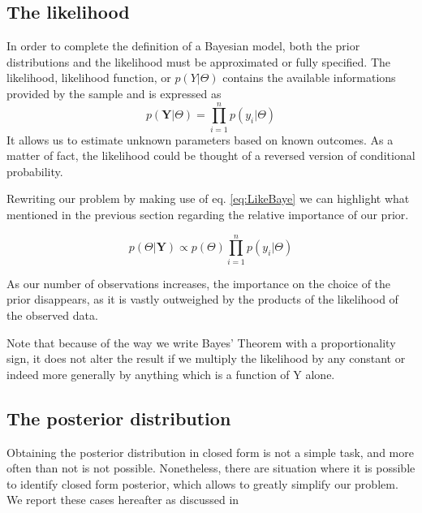 \documentclass[letterpaper]{article}
\begin{document}
\subsection{The likelihood}
In order to complete the definition of a Bayesian model, both the prior distributions and the likelihood must be approximated or fully specified.  The likelihood, likelihood function, or $p(Y|\Theta)$ contains the available informations provided by the sample and is expressed as
\begin{equation}
p(\textbf{Y}|\textbf{$\Theta$})=\prod_{i=1}^n p(y_i|\textbf{$\Theta$})
\label{eq:LikeBaye}
\end{equation}
It allows us to estimate unknown parameters based on known outcomes. As a matter of fact, the likelihood could be thought of a reversed version of conditional probability.  

Rewriting our problem by making use of eq. \ref{eq:LikeBaye} we can highlight what mentioned in the previous section regarding the relative importance of our prior.

\begin{equation}
p(\textbf{$\Theta$}|\textbf{Y}) \propto p(\textbf{$\Theta$})\prod_{i=1}^n p(y_i|\textbf{$\Theta$})
\label{ref:BayesLikeAndPrior}
\end{equation}

As our number of observations increases, the importance on the choice of the prior disappears, as it is vastly outweighed by the products of the likelihood of the observed data. 

Note that because of the way we write Bayes’ Theorem with a proportionality sign, it does not alter the result if we multiply the likelihood by any constant or indeed more generally by anything which is a function of Y alone. 

\subsection{The posterior distribution}
Obtaining the posterior distribution in closed form is not a simple task, and more often than not is not possible.  Nonetheless, there are situation where it is possible to identify closed form posterior, which allows to greatly simplify our problem. We report these cases hereafter as discussed in \citet{tsay2002}
\end{document}
